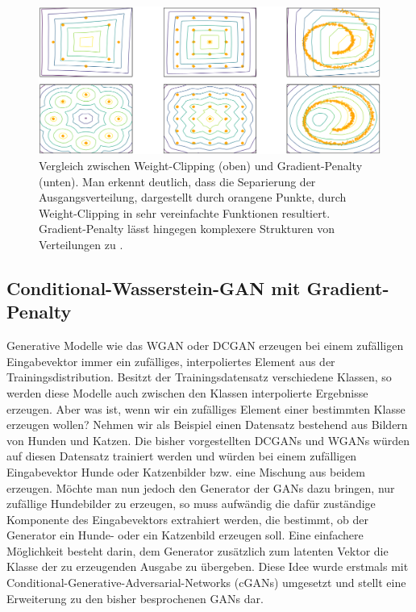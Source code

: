 \begin{figure}
\centering
\includegraphics[width=\textwidth]{images/problems_of_weight_clipping}
\caption{Vergleich zwischen Weight-Clipping (oben) und Gradient-Penalty
(unten). Man erkennt deutlich, dass die Separierung der Ausgangsverteilung,
dargestellt durch orangene Punkte, durch Weight-Clipping in sehr
vereinfachte Funktionen resultiert. Gradient-Penalty lässt hingegen
komplexere Strukturen von Verteilungen zu \cite{gulrajani2017improved}.}
\label{fig:problems-of-weight-clipping}
\end{figure}

\subsection{Conditional-Wasserstein-GAN mit Gradient-Penalty}\label{section:cwgan-gp}
Generative Modelle wie das WGAN oder DCGAN erzeugen bei einem zufälligen
Eingabevektor immer ein zufälliges, interpoliertes Element aus der
Trainingsdistribution. Besitzt der Trainingsdatensatz verschiedene Klassen, so
werden diese Modelle auch zwischen den Klassen interpolierte Ergebnisse
erzeugen. Aber was ist, wenn wir ein zufälliges Element einer bestimmten Klasse
erzeugen wollen? Nehmen wir als Beispiel einen Datensatz bestehend aus Bildern
von Hunden und Katzen. Die bisher vorgestellten DCGANs und WGANs würden auf
diesen Datensatz trainiert werden und würden bei einem zufälligen Eingabevektor
Hunde oder Katzenbilder bzw. eine Mischung aus beidem erzeugen. Möchte man nun
jedoch den Generator der GANs dazu bringen, nur zufällige Hundebilder zu
erzeugen, so muss aufwändig die dafür zuständige Komponente des Eingabevektors
extrahiert werden, die bestimmt, ob der Generator ein Hunde- oder ein Katzenbild
erzeugen soll. Eine einfachere Möglichkeit besteht darin, dem Generator
zusätzlich zum latenten Vektor die Klasse der zu erzeugenden Ausgabe zu
übergeben. Diese Idee wurde erstmals mit
Conditional-Generative-Adversarial-Networks (cGANs) \cite{mirza2014conditional}
umgesetzt und stellt eine Erweiterung zu den bisher besprochenen GANs dar.

